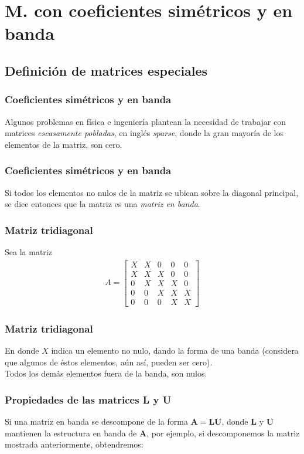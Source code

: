 \section{M. con coeficientes simétricos y en banda}
\subsection{Definición de matrices especiales}
\begin{frame}
\frametitle{Coeficientes simétricos y en banda}
Algunos problemas en física e ingeniería plantean la necesidad de trabajar con matrices \emph{escasamente pobladas}, en inglés \emph{sparse}, donde la gran mayoría de los elementos de la matriz, son cero.
\end{frame}
\begin{frame}
\frametitle{Coeficientes simétricos y en banda}
Si todos los elementos no nulos de la matriz se ubican sobre la diagonal principal, se dice entonces que la matriz es una \emph{matriz en banda}.
\end{frame}
\begin{frame}
\frametitle{Matriz tridiagonal}
Sea la matriz
\begin{align*}
A = \begin{bmatrix}
X & X & 0 & 0 & 0 \\
X & X & X & 0 & 0 \\
0 & X & X & X & 0 \\
0 & 0 & X & X & X \\
0 & 0 & 0 & X & X
\end{bmatrix}
\end{align*}
\end{frame}
\begin{frame}
\frametitle{Matriz tridiagonal}
En donde $X$ indica un elemento no nulo, dando la forma de una banda (considera que algunos de éstos elementos, aún así, pueden ser cero).
\\
\bigskip
Todos los demás elementos fuera de la banda, son nulos.
\end{frame}
\begin{frame}
\frametitle{Propiedades de las matrices \textbf{L} y \textbf{U}}
Si una matriz en banda se descompone de la forma $\mathbf{A} = \mathbf{L} \mathbf{U}$, donde $\mathbf{L}$ y $\mathbf{U}$ mantienen la estructura en banda de $\mathbf{A}$, por ejemplo, si descomponemos la matriz mostrada anteriormente, obtendremos:
\end{frame}
